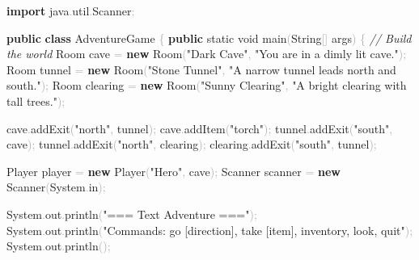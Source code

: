 \documentclass[
  justified,
  openright,
]{tufte-book}
\newcommand{\KeywordTok}[1]{\textcolor{CodeKeyword}{\textbf{#1}}}  %
\newcommand{\StringTok}[1]{\textcolor{CodeString}{#1}}              %
\newcommand{\CommentTok}[1]{\textcolor{CodeComment}{\textit{#1}}}  %
\newcommand{\CodeFuncTok}[1]{\textcolor{CodeKeyword}{#1}}           %
\newcommand{\CodeTypeTok}[1]{\textcolor{CodeType}{#1}}              %
\newcommand{\CodeAccentTok}[1]{\textcolor{CodeAccent}{#1}}          %
\newcommand{\OperatorTok}[1]{\textcolor{DarkGray}{#1}}              %
\newenvironment{Shaded}{%
  \begin{mdframed}[style=TufteCode]%
}{%
  \end{mdframed}%
}
\begin{document}
\begin{Shaded}
\begin{Highlighting}[]
\KeywordTok{import} \CodeAccentTok{java}\OperatorTok{.}\CodeAccentTok{util}\OperatorTok{.}\CodeAccentTok{Scanner}\OperatorTok{;}
 
\KeywordTok{public} \KeywordTok{class} AdventureGame \OperatorTok{\{}
    \KeywordTok{public} \CodeTypeTok{static} \CodeTypeTok{void} \CodeFuncTok{main}\OperatorTok{(}String\OperatorTok{[]} args\OperatorTok{)} \OperatorTok{\{}
        \CommentTok{// Build the world}
        Room cave \OperatorTok{=} \KeywordTok{new} \CodeFuncTok{Room}\OperatorTok{(}\StringTok{"Dark Cave"}\OperatorTok{,} \StringTok{"You are in a dimly lit cave."}\OperatorTok{);}
        Room tunnel \OperatorTok{=} \KeywordTok{new} \CodeFuncTok{Room}\OperatorTok{(}\StringTok{"Stone Tunnel"}\OperatorTok{,} \StringTok{"A narrow tunnel leads north and south."}\OperatorTok{);}
        Room clearing \OperatorTok{=} \KeywordTok{new} \CodeFuncTok{Room}\OperatorTok{(}\StringTok{"Sunny Clearing"}\OperatorTok{,} \StringTok{"A bright clearing with tall trees."}\OperatorTok{);}
 
        cave\OperatorTok{.}\CodeFuncTok{addExit}\OperatorTok{(}\StringTok{"north"}\OperatorTok{,} tunnel\OperatorTok{);}
        cave\OperatorTok{.}\CodeFuncTok{addItem}\OperatorTok{(}\StringTok{"torch"}\OperatorTok{);}
        tunnel\OperatorTok{.}\CodeFuncTok{addExit}\OperatorTok{(}\StringTok{"south"}\OperatorTok{,} cave\OperatorTok{);}
        tunnel\OperatorTok{.}\CodeFuncTok{addExit}\OperatorTok{(}\StringTok{"north"}\OperatorTok{,} clearing\OperatorTok{);}
        clearing\OperatorTok{.}\CodeFuncTok{addExit}\OperatorTok{(}\StringTok{"south"}\OperatorTok{,} tunnel\OperatorTok{);}
 
        Player player \OperatorTok{=} \KeywordTok{new} \CodeFuncTok{Player}\OperatorTok{(}\StringTok{"Hero"}\OperatorTok{,} cave\OperatorTok{);}
        Scanner scanner \OperatorTok{=} \KeywordTok{new} Scanner\OperatorTok{(}System\OperatorTok{.}\CodeFuncTok{in}\OperatorTok{);}
 
        System\OperatorTok{.}\CodeFuncTok{out}\OperatorTok{.}\CodeFuncTok{println}\OperatorTok{(}\StringTok{"=== Text Adventure ==="}\OperatorTok{);}
        System\OperatorTok{.}\CodeFuncTok{out}\OperatorTok{.}\CodeFuncTok{println}\OperatorTok{(}\StringTok{"Commands: go [direction], take [item], inventory, look, quit"}\OperatorTok{);}
        System\OperatorTok{.}\CodeFuncTok{out}\OperatorTok{.}\CodeFuncTok{println}\OperatorTok{();}
 

\end{Highlighting}
\end{Shaded}
\end{document}
